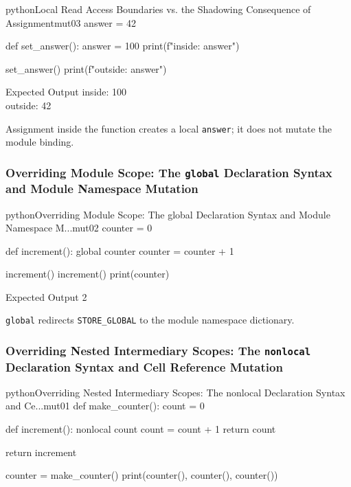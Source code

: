 \documentclass[a4paper,twoside]{report}
\begin{document}
\begin{codebox}[]{python}{Local Read Access Boundaries vs. the Shadowing Consequence of Assignment}{mut03}
answer = 42

def set_answer():
    answer = 100
    print(f"inside: {answer}")

set_answer()
print(f"outside: {answer}")
\end{codebox}


\begin{iobox}{Expected Output}
inside: 100 \\
outside: 42 \\
\end{iobox}




Assignment inside the function creates a local \texttt{answer}; it does not mutate the module binding.

\subsubsection{Overriding Module Scope: The \texttt{global} Declaration Syntax and Module Namespace Mutation}

\begin{codebox}[]{python}{Overriding Module Scope: The global Declaration Syntax and Module Namespace M...}{mut02}
counter = 0

def increment():
    global counter
    counter = counter + 1

increment()
increment()
print(counter)
\end{codebox}


\begin{iobox}{Expected Output}
2 \\
\end{iobox}




\texttt{global} redirects \texttt{STORE\_GLOBAL} to the module namespace dictionary.

\subsubsection{Overriding Nested Intermediary Scopes: The \texttt{nonlocal} Declaration Syntax and Cell Reference Mutation}

\begin{codebox}[]{python}{Overriding Nested Intermediary Scopes: The nonlocal Declaration Syntax and Ce...}{mut01}
def make_counter():
    count = 0

    def increment():
        nonlocal count
        count = count + 1
        return count

    return increment

counter = make_counter()
print(counter(), counter(), counter())
\end{codebox}
\end{document}
